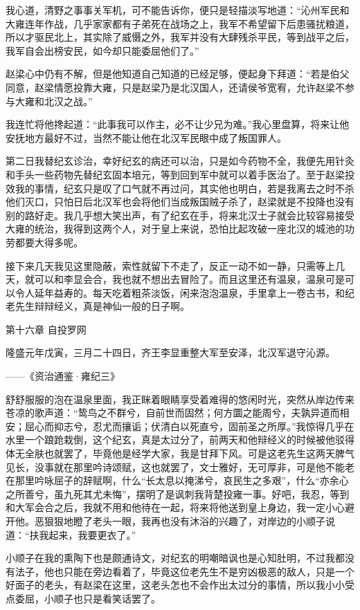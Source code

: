 我心道，清野之事事关军机，可不能告诉你，便只是轻描淡写地道：“沁州军民和大雍连年作战，几乎家家都有子弟死在战场之上，我军不希望留下后患骚扰粮道，所以才驱民北上，其实除了威慑之外，我军并没有大肆残杀平民，等到战平之后，我军自会出榜安民，如今却只能委屈他们了。”

赵梁心中仍有不解，但是他知道自己知道的已经足够，便起身下拜道：“若是伯父同意，赵梁情愿投靠大雍，只是赵梁乃是北汉国人，还请侯爷宽宥，允许赵梁不参与大雍和北汉之战。”

我连忙将他搀起道：“此事我可以作主，必不让少兄为难。”我心里盘算，将来让他安抚地方最好不过，当然不能让他在北汉军民眼中成了叛国罪人。

第二日我替纪玄诊治，幸好纪玄的病还可以治，只是如今药物不全，我便先用针灸和手头一些药物先替纪玄固本培元，等到回到军中就可以着手医治了。至于赵梁投效我的事情，纪玄只是叹了口气就不再过问，其实他也明白，若是我离去之时不杀他们灭口，只怕日后北汉军也会将他们当成叛国贼子杀了，赵梁就是不投降也没有别的路好走。我几乎想大笑出声，有了纪玄在手，将来北汉士子就会比较容易接受大雍的统治，我得到这两个人，对于皇上来说，恐怕比起攻破一座北汉的城池的功劳都要大得多呢。

接下来几天我见这里隐蔽，索性就留下不走了，反正一动不如一静，只需等上几天，就可以和李显会合，我也就不想出去冒险了。而且这里还有温泉，温泉可是可以令人延年益寿的。每天吃着粗茶淡饭，闲来泡泡温泉，手里拿上一卷古书，和纪老先生辩辩经义，真是神仙一般的日子啊。

第十六章    自投罗网

隆盛元年戊寅，三月二十四日，齐王李显重整大军至安泽，北汉军退守沁源。

——《资治通鉴·雍纪三》

舒舒服服的泡在温泉里面，我正眯着眼睛享受着难得的悠闲时光，突然从岸边传来苍凉的歌声道：“鸷鸟之不群兮，自前世而固然；何方圜之能周兮，夫孰异道而相安；屈心而抑志兮，忍尤而攘诟；伏清白以死直兮，固前圣之所厚。”我惊得几乎在水里一个踉跄栽倒，这个纪玄，真是太过分了，前两天和他辩经义的时候被他驳得体无全肤也就罢了，毕竟他是经学大家，我是甘拜下风。可是这老先生这两天脾气见长，没事就在那里吟诗颂赋，这也就罢了，文士雅好，无可厚非，可是他不能老在那里吟咏屈子的辞赋啊，什么“长太息以掩涕兮，哀民生之多艰”，什么“亦余心之所善兮，虽九死其尤未悔”，摆明了是讽刺我背楚投雍一事。好吧，我忍，等到和大军会合之后，我就不用和他待在一起，将来将他送到皇上身边，我一定小心避开他。恶狠狠地瞪了老头一眼，我再也没有沐浴的兴趣了，对岸边的小顺子说道：“扶我起来，我要更衣了。”

小顺子在我的熏陶下也是颇通诗文，对纪玄的明嘲暗讽也是心知肚明，不过我都没有法子，他也只能在旁边看着了，毕竟这位老先生不是穷凶极恶的敌人，只是一个好面子的老头，有赵梁在这里，这老头怎也不会作出太过分的事情，所以我小小受点委屈，小顺子也只是看笑话罢了。

